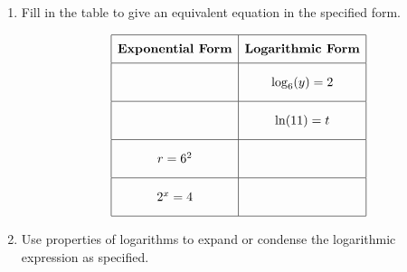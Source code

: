 \documentclass[11pt]{article}
\begin{document}
\begin{enumerate}

% 

\item %
\providecommand{\stxKnowl}{}\renewcommand{\stxKnowl}[1]{#1}
\providecommand{\stxOuttro}{}\renewcommand{\stxOuttro}[1]{#1}
\providecommand{\stxTitle}{}\renewcommand{\stxTitle}[1]{#1}
\renewcommand{\stxOuttro}[1]{}
\stxKnowl{
Fill in the table to give an equivalent equation in the specified form.

 \[\begin{array}{|c|c|} \hline \rule[-0.8em]{0pt}{2.2em} \textbf{Exponential Form} & \textbf{Logarithmic Form} \\ \hline \rule[-1.2em]{0pt}{3em} \hspace{3cm} & \log_{6}(y) = 2 \\ \hline \rule[-1.2em]{0pt}{3em} \hspace{3cm} & \ln(11) = t \\ \hline \rule[-1.2em]{0pt}{3em} r = 6^{2} & \hspace{3cm} \\ \hline \rule[-1.2em]{0pt}{3em} 2^{x} = 4 & \hspace{3cm} \\ \hline \end{array}\] 

\stxOuttro{
Solution

 \[\begin{array}{|c|c|} \hline \rule[-0.8em]{0pt}{2.2em} \textbf{Exponential Form} & \textbf{Logarithmic Form} \\ \hline \rule[-1.2em]{0pt}{3em} 6^{2} = y & \log_{6}(y) = 2 \\ \hline \rule[-1.2em]{0pt}{3em} e^{t} = 11 & \ln(11) = t \\ \hline \rule[-1.2em]{0pt}{3em} r = 6^{2} & \log_{6}(r) = 2 \\ \hline \rule[-1.2em]{0pt}{3em} 2^{x} = 4 & \log_{2}(4) = x \\ \hline \end{array}\] 

}
}

\newpage

% 

\item %
\providecommand{\stxKnowl}{}\renewcommand{\stxKnowl}[1]{#1}
\providecommand{\stxOuttro}{}\renewcommand{\stxOuttro}[1]{#1}
\providecommand{\stxTitle}{}\renewcommand{\stxTitle}[1]{#1}
\renewcommand{\stxOuttro}[1]{}
\stxKnowl{
Use properties of logarithms to expand or condense the logarithmic expression as specified.

}
\end{enumerate}
\end{document}
